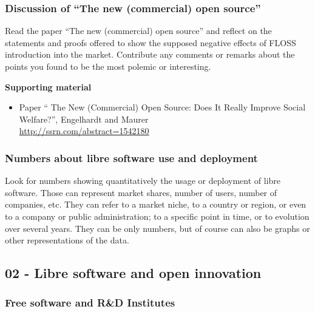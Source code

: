 \documentclass[a4paper]{article}
\begin{document}
\subsubsection{Discussion of ``The new (commercial) open source''}
\label{sub:new-oss}

Read the paper ``The new (commercial) open source'' and reflect on the statements and proofs offered to show the supposed negative effects of FLOSS introduction into the market. Contribute any comments or remarks about the points you found to be the most polemic or interesting.

\textbf{Supporting material}

\begin{itemize}
\item Paper `` The New (Commercial) Open Source: Does It Really Improve Social Welfare?'', Engelhardt and Maurer \\
  \url{http://ssrn.com/abstract=1542180}
\end{itemize}

\subsubsection{Numbers about libre software use and deployment}
\label{sub:numbers-use}

Look for numbers showing quantitatively the usage or deployment of libre software. Those can represent market shares, number of users, number of companies, etc. They can refer to a market niche, to a country or region, or even to a company or public administration; to a specific point in time, or to evolution over several years. They can be only numbers, but of course can also be graphs or other representations of the data.

\subsection{02 - Libre software and open innovation}

\subsubsection{Free software and R\&D Institutes}
\label{sub:openinnova-rd}
\end{document}
